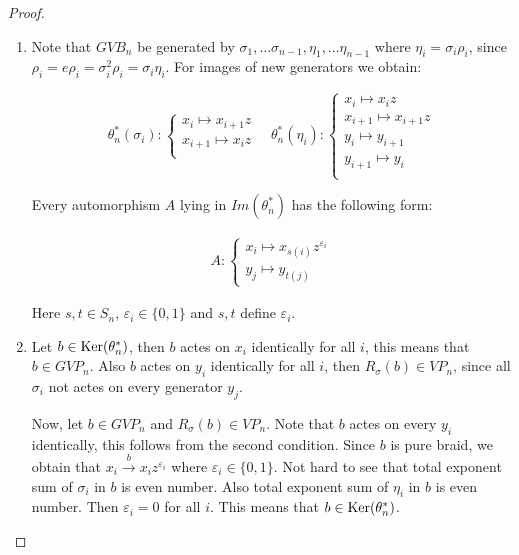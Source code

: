 \documentclass{article}
\begin{document}
\begin{proof}
\begin{enumerate}
\item Note that $GVB_n$ be generated by $\sigma_1, \ldots \sigma_{n-1}, \eta_1, \ldots \eta_{n-1}$ where $\eta_i=\sigma_i\rho_i$, since $\rho_i=e\rho_i=\sigma_i^2\rho_i=\sigma_i\eta_i$. For images of new generators we obtain:

\begin{equation}\label{newdef}
\theta_n^*(\sigma_i):
\begin{cases}
x_i \mapsto x_{i+1}z\\
x_{i+1} \mapsto x_iz\\
\end{cases}\quad
\theta_n^*(\eta_i):
\begin{cases}
x_i \mapsto x_{i}z\\
x_{i+1} \mapsto x_{i+1}z\\
y_i \mapsto y_{i+1}\\
y_{i+1} \mapsto y_i\\
\end{cases}
\end{equation}

Every automorphism $A$ lying in $Im(\theta_n^*)$ has the following form:

\begin{align*}
A:
\begin{cases}
x_i\mapsto x_{s(i)}z^{\varepsilon_i}\\
y_j\mapsto y_{t(j)}
\end{cases}
\end{align*}

Here $s,t\in S_n$, $\varepsilon_i \in \{0,1\}$ and $s,t$ define $\varepsilon_i$. 

\item Let $b\in {\rm Ker}(\theta_n^*)$, then $b$ actes on $x_i$ identically for all $i$, this means that $b\in GVP_n$. Also $b$ actes on $y_i$ identically for all $i$, then $R_{\sigma}(b)\in VP_n$, since all $\sigma_i$ not actes on every generator $y_j$.

Now, let $b\in GVP_n$ and $R_{\sigma}(b)\in VP_n$. Note that $b$ actes on every $y_i$ identically, this follows from the second condition. Since $b$ is pure braid, we obtain that $x_i\xrightarrow{b}x_iz^{\varepsilon_i}$ where $\varepsilon_i\in \{0, 1\}$. Not hard to see that total exponent sum of $\sigma_i$ in $b$ is even number. Also total exponent sum of $\eta_i$ in $b$ is even number. Then $\varepsilon_i=0$ for all $i$. This means that $b\in {\rm Ker}(\theta_n^*)$.
\end{enumerate}
\end{proof}
\end{document}

